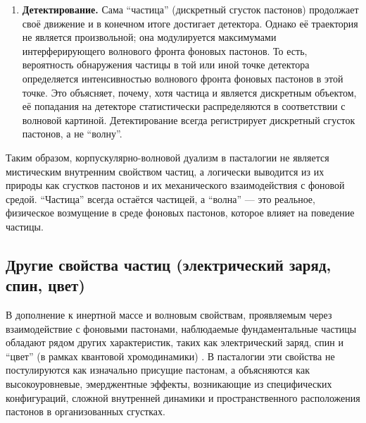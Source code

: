 \documentclass[pdflatex,sn-mathphys-num,referee]{sn-jnl}
\begin{document}
\begin{enumerate}
    \item \textbf{Детектирование.} Сама ``частица'' (дискретный сгусток пастонов) продолжает своё движение и в конечном итоге достигает детектора. Однако её траектория не является произвольной; она модулируется максимумами интерферирующего волнового фронта фоновых пастонов. То есть, вероятность обнаружения частицы в той или иной точке детектора определяется интенсивностью волнового фронта фоновых пастонов в этой точке. Это объясняет, почему, хотя частица и является дискретным объектом, её попадания на детекторе статистически распределяются в соответствии с волновой картиной. Детектирование всегда регистрирует дискретный сгусток пастонов, а не ``волну''.
\end{enumerate}

Таким образом, корпускулярно-волновой дуализм в пасталогии не является мистическим внутренним свойством частиц, а логически выводится из их природы как сгустков пастонов и их механического взаимодействия с фоновой средой. ``Частица'' всегда остаётся частицей, а ``волна'' --- это реальное, физическое возмущение в среде фоновых пастонов, которое влияет на поведение частицы.

\subsection{Другие свойства частиц (электрический заряд, спин, цвет)}\label{subsec:particle-properties}

В дополнение к инертной массе и волновым свойствам, проявляемым через взаимодействие с фоновыми пастонами, наблюдаемые фундаментальные частицы обладают рядом других характеристик, таких как электрический заряд, спин и ``цвет'' (в рамках квантовой хромодинамики) \cite{pdg2024}. В пасталогии эти свойства не постулируются как изначально присущие пастонам, а объясняются как высокоуровневые, эмерджентные эффекты, возникающие из специфических конфигураций, сложной внутренней динамики и пространственного расположения пастонов в организованных сгустках.
\end{document}
